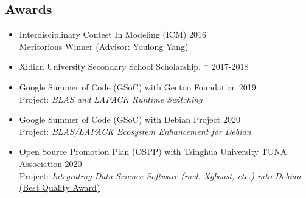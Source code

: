 \documentclass[margin,line,pifont,palatino,courier]{res}
\begin{document}
\begin{resume}
%
%
%

\section{\sc Awards}

\begin{itemize}[leftmargin=*]
	\item Interdisciplinary Contest In Modeling (ICM) \hfill 2016\\
		Meritorious Winner (Advisor: Youlong Yang)
	\item Xidian University Secondary School Scholarship.
		\href{http://see.xidian.edu.cn/html/news/9732.html}{$^+$} \hfill 2017-2018
	\item Google Summer of Code (GSoC) with Gentoo Foundation \hfill 2019\\
		Project: \textit{BLAS and LAPACK Runtime Switching}
	\item Google Summer of Code (GSoC) with Debian Project \hfill 2020\\
		Project: \textit{BLAS/LAPACK Ecosystem Enhancement for Debian}
	\item Open Source Promotion Plan (OSPP) with Tsinghua University TUNA Association \hfill 2020\\
		Project: \textit{Integrating Data Science Software (incl. Xgboost, etc.) into Debian}\\
		\href{https://isrc.iscas.ac.cn/summer2020/#/announcement}{(Best Quality Award)}
\end{itemize}


%


\end{resume}
\end{document}
